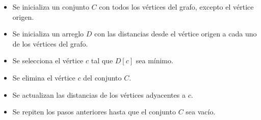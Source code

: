 \begin{itemize}
    \item Se inicializa un conjunto $C$ con todos los vértices del grafo, excepto el vértice origen.
    \item Se inicializa un arreglo $D$ con las distancias desde el vértice origen a cada uno de los vértices del grafo.
    \item Se selecciona el vértice $c$ tal que $D[c]$ sea mínimo.
    \item Se elimina el vértice $c$ del conjunto $C$.
    \item Se actualizan las distancias de los vértices adyacentes a $c$.
    \item Se repiten los pasos anteriores hasta que el conjunto $C$ sea vacío.
\end{itemize}
    